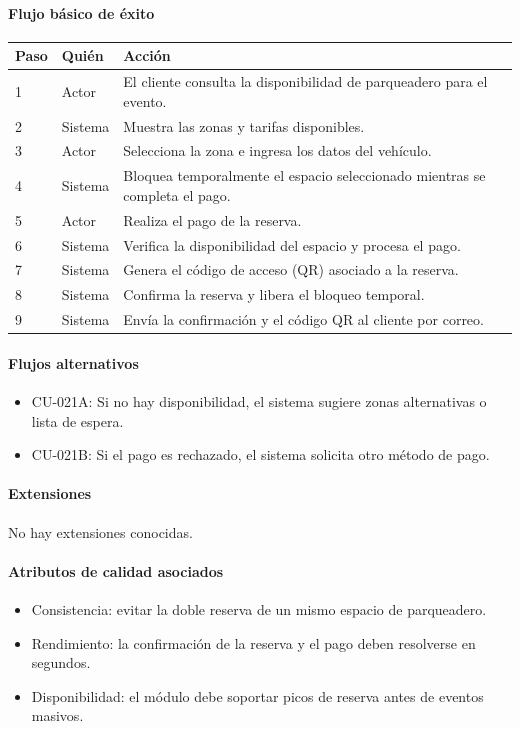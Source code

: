 \paragraph{Flujo básico de éxito}
\begin{longtable}{P{1.1cm}P{1.8cm}P{10.5cm}}
\toprule
\textbf{Paso} & \textbf{Quién} & \textbf{Acción}\\
\midrule
{} & Actor & El cliente consulta la disponibilidad de parqueadero para el evento.\\
2 & Sistema & Muestra las zonas y tarifas disponibles.\\
3 & Actor & Selecciona la zona e ingresa los datos del vehículo.\\
4 & Sistema & Bloquea temporalmente el espacio seleccionado mientras se completa el pago.\\
5 & Actor & Realiza el pago de la reserva.\\
6 & Sistema & Verifica la disponibilidad del espacio y procesa el pago.\\
7 & Sistema & Genera el código de acceso (QR) asociado a la reserva.\\
8 & Sistema & Confirma la reserva y libera el bloqueo temporal.\\
9 & Sistema & Envía la confirmación y el código QR al cliente por correo.\\
\bottomrule
\end{longtable}

\paragraph{Flujos alternativos}
\begin{itemize}[leftmargin=1.4em, topsep=1pt]
  \item CU-021A: Si no hay disponibilidad, el sistema sugiere zonas alternativas o lista de espera.
  \item CU-021B: Si el pago es rechazado, el sistema solicita otro método de pago.
\end{itemize}

\paragraph{Extensiones}
No hay extensiones conocidas.

\paragraph{Atributos de calidad asociados}
\begin{itemize}[leftmargin=1.4em, topsep=1pt]
  \item Consistencia: evitar la doble reserva de un mismo espacio de parqueadero.
  \item Rendimiento: la confirmación de la reserva y el pago deben resolverse en segundos.
  \item Disponibilidad: el módulo debe soportar picos de reserva antes de eventos masivos.
\end{itemize}

